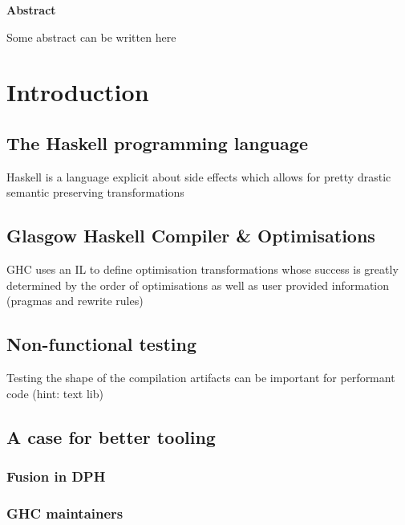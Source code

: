 \documentclass{report}
\begin{document}
\vspace*{\fill}
\begin{center}
\begin{minipage}{.7\textwidth}
\centerline{\textbf{Abstract}}
Some abstract can be written here
\end{minipage}
\end{center}
\vfill %

\thispagestyle{empty}

\newpage
\clearpage
{}
\tableofcontents

\newpage
\clearpage
{}


\newpage

\chapter{Introduction}
\section{The Haskell programming language}
Haskell is a language explicit about side effects which allows for pretty drastic semantic preserving transformations
\section{Glasgow Haskell Compiler \& Optimisations}
GHC uses an IL to define optimisation transformations whose success is greatly determined by the order of optimisations as
well as user provided information (pragmas and rewrite rules)
\section{Non-functional testing}
Testing the shape of the compilation artifacts can be important for performant code (hint: text lib)


\newpage


\section{A case for better tooling}
\subsection{Fusion in DPH}
\subsection{GHC maintainers}
\end{document}
